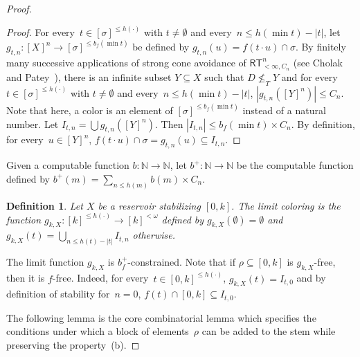 \documentclass{article}
\newcommand{\RT}[0]{\mathsf{RT}}
\newcommand{\NN}[0]{\mathbb{N}}
\numberwithin{theorem}{section}
\newtheorem{lemma}[theorem]{Lemma}
\newtheorem{definition}[theorem]{Definition}
\begin{document}
\begin{proof}
\begin{proof}
For every~$t \in [\sigma]^{\leq h(\cdot)}$ with $t \neq \emptyset$ and every~$n \leq h(\min t) - |t|$, let $g_{t, n} : [X]^n \to [\sigma]^{\leq b_f(\min t)}$ be defined by $g_{t, n}(u) = f(t \cdot u) \cap \sigma$. By finitely many successive applications of strong cone avoidance of $\RT^n_{<\infty, C_n}$ (see Cholak and Patey~\cite{cholak2020thin}), there is an infinite subset $Y \subseteq X$ such that $D \not \leq_T Y$ and for every~$t \in [\sigma]^{\leq h(\cdot)}$ with $t \neq \emptyset$ and every~$n \leq h(\min t) - |t|$, $|g_{t, n}([Y]^n)| \leq C_n$. Note that here, a color is an element of $[\sigma]^{\leq b_f(\min t)}$ instead of a natural number. Let $I_{t, n} = \bigcup g_{t, n}([Y]^n)$. Then $|I_{t, n}| \leq b_f(\min t) \times C_n$. By definition, for every~$u \in [Y]^n$, $f(t \cdot u) \cap \sigma = g_{t, n}(u) \subseteq I_{t, n}$.
\end{proof}

Given a computable function $b : \NN \to \NN$, let $b ^{+} : \NN \to \NN$ be the computable function defined by  $b^{+}(m) = \sum_{n \leq h(m)} b(m) \times C_n$.

\begin{definition}
Let $X$ be a reservoir stabilizing $[0, k]$. The \emph{limit coloring} is the function $g_{k,X} : [k]^{\leq h(\cdot)} \to [k]^{<\omega}$ defined by $g_{k,X}(\emptyset) = \emptyset$ and $g_{k,X}(t) = \bigcup_{n \leq h(t) - |t|} I_{t, n}$ otherwise.
\end{definition}

The limit function $g_{k,X}$ is $b_f^{+}$-constrained. Note that if $\rho \subseteq [0, k]$ is $g_{k,X}$-free, then it is $f$-free. Indeed, for every~$t \in [0, k]^{\leq h(\cdot)}$, $g_{k,X}(t) = I_{t, 0}$ and by definition of stability for~$n = 0$, $f(t) \cap [0, k] \subseteq I_{t, 0}$.

The following lemma is the core combinatorial lemma which specifies the conditions under which a block of elements~$\rho$ can be added to the stem while preserving the property~(b).


\end{proof}
\end{document}
